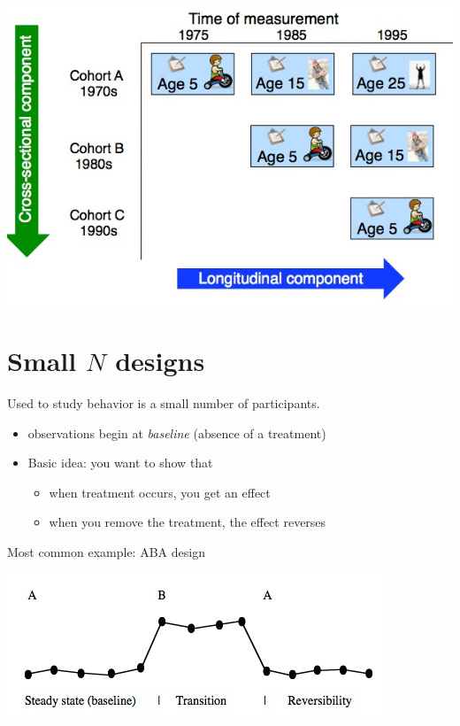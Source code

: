 \documentclass[11pt]{article}
\begin{document}
\includegraphics[width=.9\linewidth]{figures/seq.jpg}

\section*{Small $N$ designs}
\label{sec-2}

Used to study behavior is a small number of participants.

\begin{itemize}
\item observations begin at \emph{baseline} (absence of a treatment)
\item Basic idea: you want to show that
\begin{itemize}
\item when treatment occurs, you get an effect
\item when you remove the treatment, the effect reverses
\end{itemize}
\end{itemize}

Most common example: ABA design

\includegraphics[width=.9\linewidth]{figures/aba.jpg}
\end{document}
